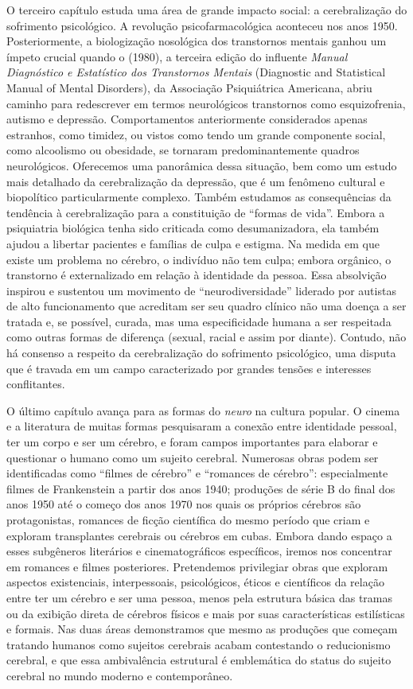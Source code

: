 O terceiro capítulo estuda uma área de grande impacto social: a
cerebralização do sofrimento psicológico. A revolução psicofarmacológica
aconteceu nos anos 1950. Posteriormente, a biologização nosológica dos
transtornos mentais ganhou um ímpeto crucial quando o   (1980), a
terceira edição do influente \emph{Manual Diagnóstico e Estatístico dos
Transtornos Mentais} (Diagnostic and Statistical Manual of Mental
Disorders), da Associação Psiquiátrica Americana, abriu caminho para
redescrever em termos neurológicos transtornos como esquizofrenia,
autismo e depressão. Comportamentos anteriormente considerados apenas
estranhos, como timidez, ou vistos como tendo um grande componente
social, como alcoolismo ou obesidade, se tornaram predominantemente
quadros neurológicos. Oferecemos uma panorâmica dessa situação, bem como
um estudo mais detalhado da cerebralização da depressão, que é um
fenômeno cultural e biopolítico particularmente complexo. Também
estudamos as consequências da tendência à cerebralização para a
constituição de ``formas de vida''. Embora a psiquiatria biológica tenha
sido criticada como desumanizadora, ela também ajudou a libertar
pacientes e famílias de culpa e estigma. Na medida em que existe um
problema no cérebro, o indivíduo não tem culpa; embora orgânico, o
transtorno é externalizado em relação à identidade da pessoa. Essa
absolvição inspirou e sustentou um movimento de ``neurodiversidade''
liderado por autistas de alto funcionamento que acreditam ser seu quadro
clínico não uma doença a ser tratada e, se possível, curada, mas uma
especificidade humana a ser respeitada como outras formas de diferença
(sexual, racial e assim por diante). Contudo, não há consenso a respeito da
cerebralização do sofrimento psicológico, uma disputa que é travada em
um campo caracterizado por grandes tensões e interesses conflitantes.

O último capítulo avança para as formas do \emph{neuro} na cultura
popular. O cinema e a literatura de muitas formas pesquisaram a conexão
entre identidade pessoal, ter um corpo e ser um cérebro, e foram campos
importantes para elaborar e questionar o humano como um sujeito
cerebral. Numerosas obras podem ser identificadas como ``filmes de
cérebro'' e ``romances de cérebro'': especialmente filmes de
Frankenstein a partir dos anos 1940; produções de série B do final dos
anos 1950 até o começo dos anos 1970 nos quais os próprios cérebros são
protagonistas, romances de ficção científica do mesmo período que criam
e exploram transplantes cerebrais ou cérebros em cubas. Embora dando
espaço a esses subgêneros literários e cinematográficos específicos,
iremos nos concentrar em romances e filmes posteriores. Pretendemos
privilegiar obras que exploram aspectos existenciais, interpessoais,
psicológicos, éticos e científicos da relação entre ter um cérebro e ser
uma pessoa, menos pela estrutura básica das tramas ou da exibição direta
de cérebros físicos e mais por suas características estilísticas e
formais. Nas duas áreas demonstramos que mesmo as produções que começam
tratando humanos como sujeitos cerebrais acabam contestando o
reducionismo cerebral, e que essa ambivalência estrutural é emblemática
do status do sujeito cerebral no mundo moderno e contemporâneo.

